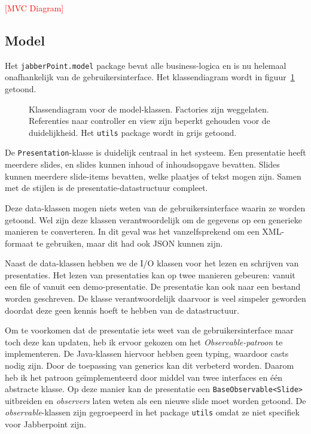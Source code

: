 \documentclass[a4paper]{article}
\newcommand{\todo}[1]{\textcolor{red}{[#1]}\\}
\newcommand{\code}[1]{\lstinline[columns=fixed]{#1}}
\newcommand{\diagram}[3][1.3]{
	\begin{figure}[!htb]
	 \caption{#3}
	 \label{diagram:#2}
	 \makebox[\textwidth][c]{\texttt{[image: Diagrams/\#2.pdf]}}%
	\end{figure}
}
\begin{document}
		\todo{MVC Diagram}

	\subsection{Model}
		Het \code{jabberPoint.model} package bevat alle business-logica en is nu helemaal onafhankelijk van de gebruikersinterface.
		Het klassendiagram wordt in figuur~\ref{diagram:model} getoond.

		\diagram{model}{
			Klassendiagram voor de model-klassen.
			Factories zijn weggelaten.
			Referenties naar controller en view zijn beperkt gehouden voor de duidelijkheid.
			Het \code{utils} package wordt in grijs getoond.
		}

		De \code{Presentation}-klasse is duidelijk centraal in het systeem.
		Een presentatie heeft meerdere slides, en slides kunnen inhoud of inhoudsopgave bevatten.
		Slides kunnen meerdere slide-items bevatten, welke plaatjes of tekst mogen zijn.
		Samen met de stijlen is de presentatie-datastructuur compleet.

		Deze data-klassen mogen niets weten van de gebruikersinterface waarin ze worden getoond.
		Wel zijn deze klassen verantwoordelijk om de gegevens op een generieke manieren te converteren.
		In dit geval was het vanzelfsprekend om een XML-formaat te gebruiken, maar dit had ook JSON kunnen zijn.

		Naast de data-klassen hebben we de I/O klassen voor het lezen en schrijven van presentaties.
		Het lezen van presentaties kan op twee manieren gebeuren: vanuit een file of vanuit een demo-presentatie.
		De presentatie kan ook naar een bestand worden geschreven.
		De klasse verantwoordelijk daarvoor is veel simpeler geworden doordat deze geen kennis hoeft te hebben van de datastructuur.

		Om te voorkomen dat de presentatie iets weet van de gebruikersinterface maar toch deze kan updaten, heb ik ervoor gekozen om het \textit{Observable-patroon} te implementeren.
		De Java-klassen hiervoor hebben geen typing, waardoor casts nodig zijn.
		Door de toepassing van generics kan dit verbeterd worden.
		Daarom heb ik het patroon geïmplementeerd door middel van twee interfaces en één abstracte klasse.
		Op deze manier kan de presentatie een \code{BaseObservable<Slide>} uitbreiden en \textit{observers} laten weten als een nieuwe slide moet worden getoond.
		De \textit{observable}-klassen zijn gegroepeerd in het package \code{utils} omdat ze niet specifiek voor Jabberpoint zijn.
\end{document}
